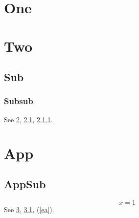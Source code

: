 
\section{One}
\section{Two}\label{s2}
\subsection{Sub}\label{ss}
\subsubsection{Subsub}\label{sss}
See \ref{s2}, \ref{ss}, \ref{sss}.
\appendix
\section{App}\label{a}
\subsection{AppSub}\label{as}
\begin{equation} x=1 \label{ea}\end{equation}
See \ref{a}, \ref{as}, (\ref{ea}).

